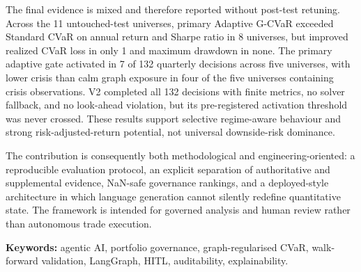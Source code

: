 \documentclass[11pt]{article}
\begin{document}
The final evidence is mixed and therefore reported without post-test retuning. Across the 11 untouched-test universes, primary Adaptive G-CVaR exceeded Standard CVaR on annual return and Sharpe ratio in 8 universes, but improved realized CVaR loss in only 1 and maximum drawdown in none. The primary adaptive gate activated in 7 of 132 quarterly decisions across five universes, with lower crisis than calm graph exposure in four of the five universes containing crisis observations. V2 completed all 132 decisions with finite metrics, no solver fallback, and no look-ahead violation, but its pre-registered activation threshold was never crossed. These results support selective regime-aware behaviour and strong risk-adjusted-return potential, not universal downside-risk dominance.

The contribution is consequently both methodological and engineering-oriented: a reproducible evaluation protocol, an explicit separation of authoritative and supplemental evidence, NaN-safe governance rankings, and a deployed-style architecture in which language generation cannot silently redefine quantitative state. The framework is intended for governed analysis and human review rather than autonomous trade execution.

\medskip
\noindent\textbf{Keywords:} agentic AI, portfolio governance, graph-regularised CVaR, walk-forward validation, LangGraph, HITL, auditability, explainability.



\iffalse
\end{document}
